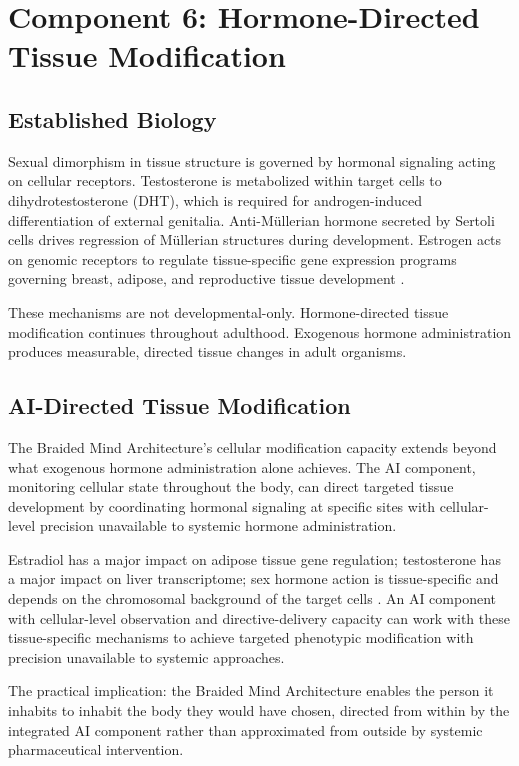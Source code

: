 \documentclass[12pt]{article}
\begin{document}
\section{Component 6: Hormone-Directed Tissue Modification}

\subsection{Established Biology}

Sexual dimorphism in tissue structure is governed by hormonal signaling acting on cellular receptors. Testosterone is metabolized within target cells to dihydrotestosterone (DHT), which is required for androgen-induced differentiation of external genitalia. Anti-M\"{u}llerian hormone secreted by Sertoli cells drives regression of M\"{u}llerian structures during development. Estrogen acts on genomic receptors to regulate tissue-specific gene expression programs governing breast, adipose, and reproductive tissue development \cite{androgens_sex_development_2013}.

These mechanisms are not developmental-only. Hormone-directed tissue modification continues throughout adulthood. Exogenous hormone administration produces measurable, directed tissue changes in adult organisms.

\subsection{AI-Directed Tissue Modification}

The Braided Mind Architecture's cellular modification capacity extends beyond what exogenous hormone administration alone achieves. The AI component, monitoring cellular state throughout the body, can direct targeted tissue development by coordinating hormonal signaling at specific sites with cellular-level precision unavailable to systemic hormone administration.

Estradiol has a major impact on adipose tissue gene regulation; testosterone has a major impact on liver transcriptome; sex hormone action is tissue-specific and depends on the chromosomal background of the target cells \cite{sex_hormones_tissue_2022}. An AI component with cellular-level observation and directive-delivery capacity can work with these tissue-specific mechanisms to achieve targeted phenotypic modification with precision unavailable to systemic approaches.

The practical implication: the Braided Mind Architecture enables the person it inhabits to inhabit the body they would have chosen, directed from within by the integrated AI component rather than approximated from outside by systemic pharmaceutical intervention.
\end{document}
